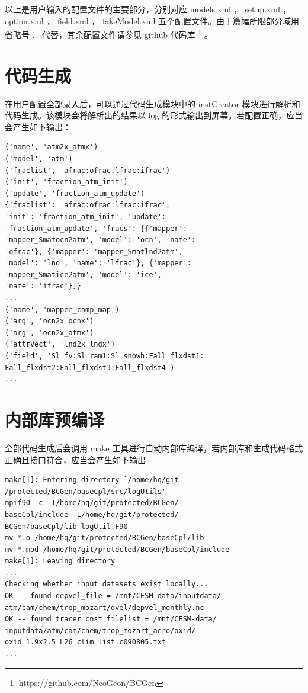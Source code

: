 以上是用户输入的配置文件的主要部分，分别对应 models.xml ， setup.xml ， option.xml ， field.xml ，  fakeModel.xml 五个配置文件。由于篇幅所限部分域用省略号 ... 代替，其余配置文件请参见 github 代码库 \footnote{https://github.com/NeoGeon/BCGen} 。

\section {代码生成}

在用户配置全部录入后，可以通过代码生成模块中的 instCreator 模块进行解析和代码生成。该模块会将解析出的结果以 log 的形式输出到屏幕。若配置正确，应当会产生如下输出：

\begin{lstlisting}
('name', 'atm2x_atmx')
('model', 'atm')
('fraclist', 'afrac:ofrac:lfrac:ifrac')
('init', 'fraction_atm_init')
('update', 'fraction_atm_update')
{'fraclist': 'afrac:ofrac:lfrac:ifrac', 
'init': 'fraction_atm_init', 'update': 
'fraction_atm_update', 'fracs': [{'mapper': 
'mapper_Smatocn2atm', 'model': 'ocn', 'name': 
'ofrac'}, {'mapper': 'mapper_Smatlnd2atm',
'model': 'lnd', 'name': 'lfrac'}, {'mapper':
'mapper_Smatice2atm', 'model': 'ice',
'name': 'ifrac'}]}
...
('name', 'mapper_comp_map')
('arg', 'ocn2x_ocnx')
('arg', 'ocn2x_atmx')
('attrVect', 'lnd2x_lndx')
('field', 'Sl_fv:Sl_ram1:Sl_snowh:Fall_flxdst1:
Fall_flxdst2:Fall_flxdst3:Fall_flxdst4')
...
\end{lstlisting}

\section {内部库预编译}

全部代码生成后会调用 make 工具进行自动内部库编译，若内部库和生成代码格式正确且接口符合，应当会产生如下输出

\begin{lstlisting}
make[1]: Entering directory `/home/hq/git
/protected/BCGen/baseCpl/src/logUtils'
mpif90 -c -I/home/hq/git/protected/BCGen/
baseCpl/include -L/home/hq/git/protected/
BCGen/baseCpl/lib logUtil.F90 
mv *.o /home/hq/git/protected/BCGen/baseCpl/lib
mv *.mod /home/hq/git/protected/BCGen/baseCpl/include
make[1]: Leaving directory 
...
Checking whether input datasets exist locally...
OK -- found depvel_file = /mnt/CESM-data/inputdata/
atm/cam/chem/trop_mozart/dvel/depvel_monthly.nc
OK -- found tracer_cnst_filelist = /mnt/CESM-data/
inputdata/atm/cam/chem/trop_mozart_aero/oxid/
oxid_1.9x2.5_L26_clim_list.c090805.txt
...
\end{lstlisting}

